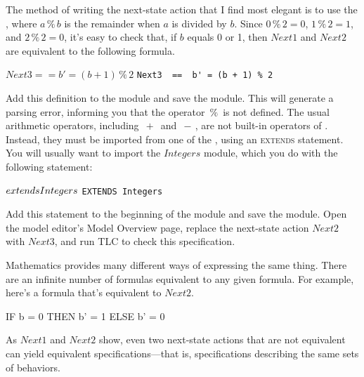 The method of writing the next-state action that I find most
elegant is to use the 
  ,
where $a\,\%\, b$ is the remainder when $a$ is divided by $b$. 
Since $0\,\%\,2 = 0$, $1\,\%\,2 = 1$, and $2\,\%\,2 = 0$,
it's easy to check that, if $b$ equals 0 or 1, then $Next1$ and
$Next2$ are equivalent to the following formula.
\begin{display}
\begin{twocols}
$Next3  ==  b' = (b+1)\,\%\,2$
\midcol
\verb|Next3  ==  b' = (b + 1) % 2|
\end{twocols}
\end{display}
Add this definition to the module and save the module.  This will
generate a parsing error, informing you that the operator \,$\%$\, is
not defined.  The usual arithmetic operators, including $\,+\,$ and
$\,-\,$, are not built-in operators of \tlaplus.  Instead, they must be
imported from one of the , using an \textsc{extends} statement.
You will usually want to import the 
$Integers$ module, which you do
with the following statement:%
\begin{display}
\begin{twocols}
$\EXTENDS Integers$%
\midcol
\verb|EXTENDS Integers|
\end{twocols}
\end{display}
Add this statement to the 
beginning%
of the module and save the module.  Open the model editor's
\textsf{Model Overview} page, replace the next-state action $Next2$
with $Next3$, and run TLC to check this specification.

\pause

\noindent
Mathematics provides many different ways of expressing the same thing.
There are an infinite number of formulas equivalent to any given
formula.  For example, here's a formula that's equivalent to 
$Next2$.
\begin{display}
\begin{notla}
IF b = 0 THEN b' = 1
         ELSE b' = 0
\end{notla}
\begin{tlatex}
%
%
\end{tlatex}
\end{display}
As $Next1$ and $Next2$ show, even two next-state actions that are not
equivalent can yield equivalent specifications---that is,
specifications describing the same sets of behaviors.

